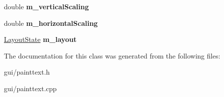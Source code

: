 \begin{DoxyCompactItemize}
\item 
double {\bfseries m\+\_\+vertical\+Scaling}\hypertarget{classPaintText_a1a3a04223a72e47e04d48479ac9cebc3}{}\label{classPaintText_a1a3a04223a72e47e04d48479ac9cebc3}

\item 
double {\bfseries m\+\_\+horizontal\+Scaling}\hypertarget{classPaintText_af6ea0cb3c96c217b37a567a241c9c1f1}{}\label{classPaintText_af6ea0cb3c96c217b37a567a241c9c1f1}

\item 
\hyperlink{structPaintText_1_1LayoutState}{Layout\+State} {\bfseries m\+\_\+layout}\hypertarget{classPaintText_ae790afb0e41bdc4e72e69c0c1534bca7}{}\label{classPaintText_ae790afb0e41bdc4e72e69c0c1534bca7}

\end{DoxyCompactItemize}


The documentation for this class was generated from the following files\+:\begin{DoxyCompactItemize}
\item 
gui/painttext.\+h\item 
gui/painttext.\+cpp\end{DoxyCompactItemize}

